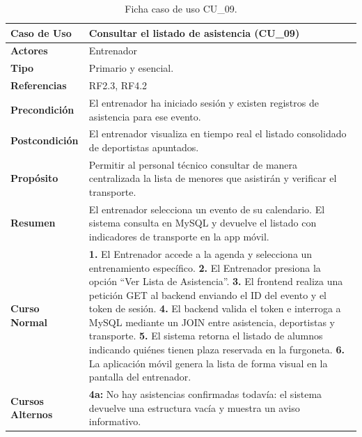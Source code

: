         \begin{table}[htbp]
        \centering
        \footnotesize
        \renewcommand{\arraystretch}{0.85}
        \begin{tabularx}{\textwidth}{|l|X|}
        \hline
        \rowcolor[HTML]{EFEFEF} 
        \textbf{Caso de Uso} & \textbf{Consultar el listado de asistencia (CU\_09)} \\ \hline
        \textbf{Actores} & Entrenador \\ \hline
        \textbf{Tipo} & Primario y esencial. \\ \hline
        \textbf{Referencias} & RF2.3, RF4.2 \\ \hline
        \textbf{Precondición} & El entrenador ha iniciado sesión y existen registros de asistencia para ese evento. \\ \hline
        \textbf{Postcondición} & El entrenador visualiza en tiempo real el listado consolidado de deportistas apuntados. \\ \hline
        \textbf{Propósito} & Permitir al personal técnico consultar de manera centralizada la lista de menores que asistirán y verificar el transporte. \\ \hline
        \textbf{Resumen} & El entrenador selecciona un evento de su calendario. El sistema consulta en MySQL y devuelve el listado con indicadores de transporte en la app móvil. \\ \hline
        \textbf{Curso Normal} & 
        \textbf{1.} El Entrenador accede a la agenda y selecciona un entrenamiento específico.\newline
        \textbf{2.} El Entrenador presiona la opción ``Ver Lista de Asistencia''.\newline
        \textbf{3.} El frontend realiza una petición GET al backend enviando el ID del evento y el token de sesión.\newline
        \textbf{4.} El backend valida el token e interroga a MySQL mediante un JOIN entre asistencia, deportistas y transporte.\newline
        \textbf{5.} El sistema retorna el listado de alumnos indicando quiénes tienen plaza reservada en la furgoneta.\newline
        \textbf{6.} La aplicación móvil genera la lista de forma visual en la pantalla del entrenador. \\ \hline
        \textbf{Cursos Alternos} & 
        \textbf{4a:} No hay asistencias confirmadas todavía: el sistema devuelve una estructura vacía y muestra un aviso informativo. \\ \hline
        \end{tabularx}
        \caption{Ficha caso de uso CU\_09.}
        \label{tab:cu_09}
        \end{table}


